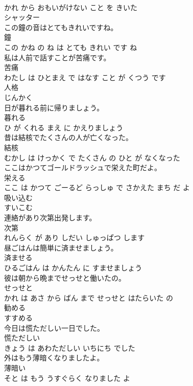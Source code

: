 \documentclass[8pt]{extreport}
\begin{document}
\begin{CJK}{UTF8}{min}
\\	かれ から おもいがけない こと を きいた			
\\	シャッター	
\\	この鐘の音はとてもきれいですね。	
\\	鐘 
\\	この かね の ね は とても きれい です ね			
\\	私は人前で話すことが苦痛です。	
\\	苦痛 
\\	わたし は ひとまえ で はなす こと が くつう です			
\\	人格	
\\	じんかく			
\\	日が暮れる前に帰りましょう。	
\\	暮れる 
\\	ひ が くれる まえ に かえりましょう			
\\	昔は結核でたくさんの人が亡くなった。	
\\	結核 
\\	むかし は けっかく で たくさん の ひと が なくなった			
\\	ここはかつてゴールドラッシュで栄えた町だよ。	
\\	栄える 
\\	ここ は かつて ごーるど らっしゅ で さかえた まち だ よ			
\\	吸い込む	
\\	すいこむ			
\\	連絡があり次第出発します。	
\\	次第 
\\	れんらく が あり しだい しゅっぱつ します			
\\	昼ごはんは簡単に済ませましょう。	
\\	済ませる 
\\	ひるごはん は かんたん に すませましょう			
\\	彼は朝から晩までせっせと働いたの。	
\\	せっせと 
\\	かれ は あさ から ばん まで せっせと はたらいた の			
\\	勧める	
\\	すすめる			
\\	今日は慌ただしい一日でした。	
\\	慌ただしい 
\\	きょう は あわただしい いちにち でした			
\\	外はもう薄暗くなりましたよ。	
\\	薄暗い 
\\	そと は もう うすぐらく なりました よ			

\end{CJK}
\end{document}
